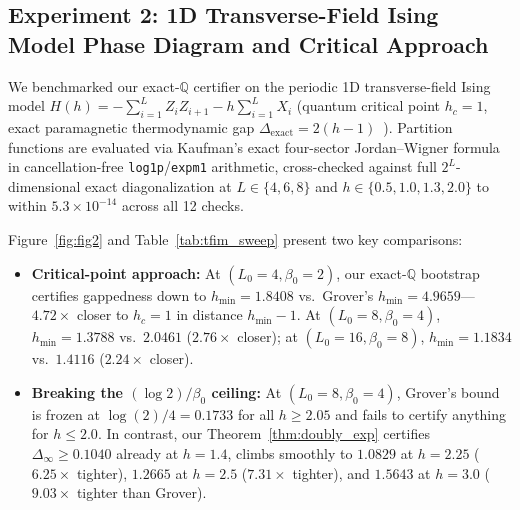 \documentclass[11pt,a4paper]{article}
\theoremstyle{definition}
\newcommand{\Q}{\mathbb{Q}}
\begin{document}
\subsection{Experiment 2: 1D Transverse-Field Ising Model Phase Diagram and Critical Approach}

We benchmarked our exact-$\Q$ certifier on the periodic 1D transverse-field Ising model $H(h) = -\sum_{i=1}^L Z_i Z_{i+1} - h \sum_{i=1}^L X_i$ (quantum critical point $h_c = 1$, exact paramagnetic thermodynamic gap $\Delta_{\mathrm{exact}} = 2(h-1)$~\cite{Pfeuty1970Ising}). Partition functions are evaluated via Kaufman's exact four-sector Jordan--Wigner formula~\cite{Kaufman1949Crystal} in cancellation-free \texttt{log1p}/\texttt{expm1} arithmetic, cross-checked against full $2^L$-dimensional exact diagonalization at $L \in \{4,6,8\}$ and $h \in \{0.5, 1.0, 1.3, 2.0\}$ to within $5.3 \times 10^{-14}$ across all 12 checks.

Figure~\ref{fig:fig2} and Table~\ref{tab:tfim_sweep} present two key comparisons:
\begin{itemize}[leftmargin=1.6em,itemsep=2pt]
  \item \textbf{Critical-point approach:} At $(L_0=4, \beta_0=2)$, our exact-$\Q$ bootstrap certifies gappedness down to $h_{\min} = 1.8408$ vs.\ Grover's $h_{\min} = 4.9659$—$\mathbf{4.72\times}$ closer to $h_c = 1$ in distance $h_{\min} - 1$. At $(L_0=8, \beta_0=4)$, $h_{\min} = 1.3788$ vs.\ $2.0461$ ($\mathbf{2.76\times}$ closer); at $(L_0=16, \beta_0=8)$, $h_{\min} = 1.1834$ vs.\ $1.4116$ ($\mathbf{2.24\times}$ closer).
  \item \textbf{Breaking the $(\log 2)/\beta_0$ ceiling:} At $(L_0=8, \beta_0=4)$, Grover's bound is frozen at $\log(2)/4 = 0.1733$ for all $h \ge 2.05$ and fails to certify anything for $h \le 2.0$. In contrast, our Theorem~\ref{thm:doubly_exp} certifies $\Delta_\infty \ge 0.1040$ already at $h=1.4$, climbs smoothly to $1.0829$ at $h=2.25$ ($6.25\times$ tighter), $1.2665$ at $h=2.5$ ($7.31\times$ tighter), and $1.5643$ at $h=3.0$ ($\mathbf{9.03\times}$ tighter than Grover).
\end{itemize}
\end{document}
